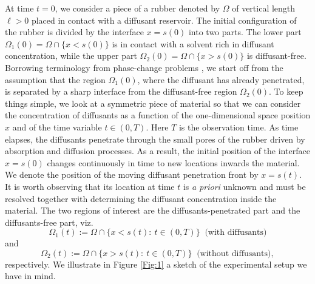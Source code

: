 \documentclass{article}
\begin{document}
At time $t = 0$, we consider a piece of a rubber denoted by $\Omega$ of vertical length $\ell>0$ placed in contact with a diffusant reservoir. The initial configuration of the rubber is divided by the interface $x= s(0)$ into two parts.  The lower part  $\Omega_1(0) = \Omega \cap \{x < s(0)\}$ is in contact with a solvent rich in diffusant concentration, while the upper part  $\Omega_2(0) =\Omega \cap \{x > s(0)\}$ is diffusant-free. Borrowing terminology from phase-change problems \cite{alexiades1992mathematical}, we start off from the assumption that the region  $\Omega_1(0)$, where the diffusant has already penetrated, is separated by  a sharp interface  from    the diffusant-free region $\Omega_2(0)$.  
To keep things simple, we look at a symmetric piece of material  so that we can consider the concentration of diffusants as a function of the one-dimensional space position $x$ and of the time variable $t\in(0,T)$.  Here $T$ is the observation time. 
As time elapses, the diffusants penetrate through the small pores of the rubber driven by absorption and diffusion processes. As a result, the initial position of the interface $x= s(0)$ changes continuously in time to new locations inwards the material. We denote the position of the moving diffusant penetration front by  $x=s(t)$.  It is worth observing that its location at time $t$ is {\em a priori} unknown and must be resolved together with determining the diffusant concentration inside the material.  The two regions of interest are  the diffusants-penetrated part and the diffusants-free part, viz.  $$\Omega_1(t) := \Omega \cap \{x < s(t): \ t\in(0,T)\} \;\;\text{(with diffusants)}$$   and  $$\Omega_2(t) :=  \Omega \cap \{x > s(t): \ t\in(0,T)\}\;\;\text{(without diffusants)},$$ respectively. We illustrate in Figure \ref{Fig:1} a sketch of the experimental setup we have in  mind. 
\end{document}
